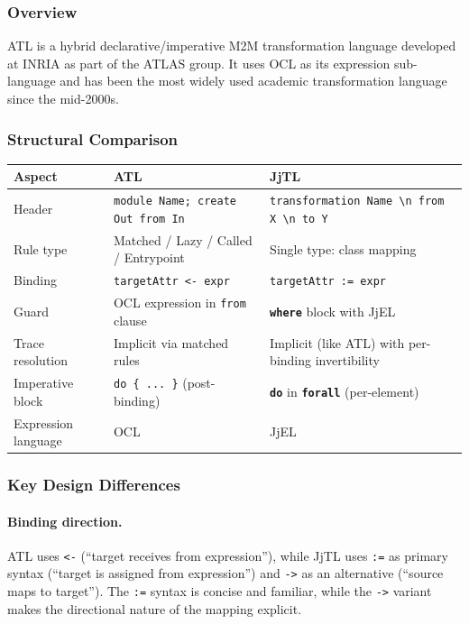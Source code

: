 \documentclass[11pt,a4paper]{article}
\newcommand{\jjel}{\textsf{JjEL}}
\newcommand{\jjtl}{\textsf{JjTL}}
\newcommand{\kw}[1]{\texttt{\textbf{#1}}}
\begin{document}
\subsubsection{Overview}

ATL is a hybrid declarative/imperative M2M transformation language developed at INRIA as part of the ATLAS group. It uses OCL as its expression sub-language and has been the most widely used academic transformation language since the mid-2000s.

\subsubsection{Structural Comparison}

\begin{center}
\begin{tabularx}{\textwidth}{@{}lXX@{}}
\toprule
\textbf{Aspect} & \textbf{ATL} & \textbf{JjTL} \\
\midrule
Header & \texttt{module Name; create Out from In} & \texttt{transformation Name \textbackslash n from X \textbackslash n to Y} \\
Rule type & Matched / Lazy / Called / Entrypoint & Single type: class mapping \\
Binding & \texttt{targetAttr <- expr} & \texttt{targetAttr := expr} \\
Guard & OCL expression in \texttt{from} clause & \kw{where} block with \jjel{} \\
Trace resolution & Implicit via matched rules & Implicit (like ATL) with per-binding invertibility \\
Imperative block & \texttt{do \{ ... \}} (post-binding) & \kw{do} in \kw{forall} (per-element) \\
Expression language & OCL & \jjel{} \\
\bottomrule
\end{tabularx}
\end{center}

\subsubsection{Key Design Differences}

\paragraph{Binding direction.} ATL uses \texttt{<-} (``target receives from expression''), while \jjtl{} uses \texttt{:=} as primary syntax (``target is assigned from expression'') and \texttt{->} as an alternative (``source maps to target''). The \texttt{:=} syntax is concise and familiar, while the \texttt{->} variant makes the directional nature of the mapping explicit.
\end{document}
